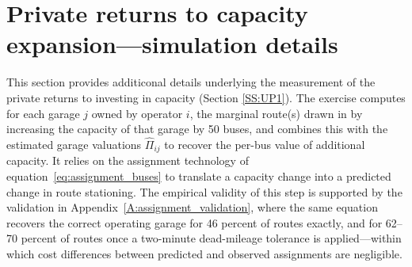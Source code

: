 \documentclass[12pt]{article}
\newcommand{\rootdir}{..}  %
\newcommand{\tables}{\rootdir/\rootdir/Output/tables}
\newcommand\fnote[1]{\captionsetup{font=small}\caption*{\emph{Notes}: #1}} %
\begin{document}
\begin{table}[!tb]
\caption{Validation of the route-garage assignment equation (garage capacity $+30\%$)}\label{tab:assignment_validation_30perc}
\centering

\fnote{As Table~\ref{tab:assignment_validation}, except that all garage PVR
capacities are scaled up by 30 percent prior to assignment. This robustness
check assesses sensitivity to capacity measurement error and to the share of
unassigned routes attributable to binding capacity constraints rather than
to geographic mismatch.}
\end{table}


\clearpage


\section{Private returns to capacity expansion---simulation details}\label{A:Capacity_expansion_details}
This section provides additiconal details underlying the measurement of the private returns to investing in capacity (Section \ref{SS:UP1}). The exercise computes for each garage
$j$ owned by operator $i$, the marginal route(s) drawn in by increasing the capacity of that garage by 50 buses, and combines this with the estimated garage valuations
$\hat{\Pi}_{ij}$ to recover the per-bus value of additional capacity. It relies on 
the assignment technology of equation~\eqref{eq:assignment_buses} to 
translate a capacity change into a predicted change in route stationing. 
The empirical validity of this step is supported by the validation in 
Appendix~\ref{A:assignment_validation}, where the same equation recovers 
the correct operating garage for 46 percent of routes exactly, and for 
62--70 percent of routes once a two-minute dead-mileage tolerance is 
applied---within which cost differences between predicted and observed 
assignments are negligible.
\end{document}
